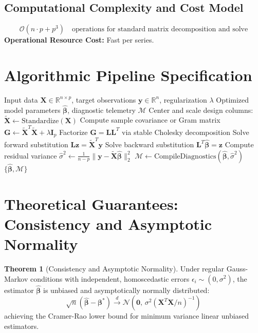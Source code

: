 \documentclass[11pt,a4paper]{article}
\theoremstyle{definition}
\newtheorem{theorem}{\textbf{Theorem}}[section]
\begin{document}
\subsection{Computational Complexity and Cost Model}
\begin{equation}
\mathcal{O}(n \cdot p + p^3) \quad \text{operations for standard matrix decomposition and solve}
\end{equation}
\textbf{Operational Resource Cost:} Fast per series.

\section{Algorithmic Pipeline Specification}

\begin{algorithm}[H]
\caption{Decomposable forecasting models Execution}
\begin{algorithmic}[1]
\Require Input data $\mathbf{X} \in \mathbb{R}^{n \times p}$, target observations $\mathbf{y} \in \mathbb{R}^n$, regularization $\lambda$
\Ensure Optimized model parameters $\hat{\boldsymbol{\beta}}$, diagnostic telemetry $\mathcal{M}$
\State Center and scale design columns: $\tilde{\mathbf{X}} \gets \text{Standardize}(\mathbf{X})$
\State Compute sample covariance or Gram matrix $\mathbf{G} \gets \tilde{\mathbf{X}}^T \tilde{\mathbf{X}} + \lambda \mathbf{I}_p$
\State Factorize $\mathbf{G} = \mathbf{L} \mathbf{L}^T$ via stable Cholesky decomposition
\State Solve forward substitution $\mathbf{L} \mathbf{z} = \tilde{\mathbf{X}}^T \mathbf{y}$
\State Solve backward substitution $\mathbf{L}^T \hat{\boldsymbol{\beta}} = \mathbf{z}$
\State Compute residual variance $\hat{\sigma}^2 \gets \frac{1}{n - p} \| \mathbf{y} - \tilde{\mathbf{X}} \hat{\boldsymbol{\beta}} \|_2^2$
\State $\mathcal{M} \gets \text{CompileDiagnostics}(\hat{\boldsymbol{\beta}}, \hat{\sigma}^2)$
\State \Return $\{\hat{\boldsymbol{\beta}}, \mathcal{M}\}$
\end{algorithmic}
\end{algorithm}

\section{Theoretical Guarantees: Consistency and Asymptotic Normality}

\begin{theorem}[Consistency and Asymptotic Normality]
Under regular Gauss-Markov conditions with independent, homoscedastic errors $\epsilon_i \sim (0, \sigma^2)$, the estimator $\hat{\boldsymbol{\beta}}$ is unbiased and asymptotically normally distributed:
\begin{equation}
\sqrt{n}(\hat{\boldsymbol{\beta}} - \boldsymbol{\beta}^*) \xrightarrow{d} \mathcal{N}\left(\mathbf{0}, \, \sigma^2 (\mathbf{X}^T \mathbf{X} / n)^{-1}\right)
\end{equation}
achieving the Cramer-Rao lower bound for minimum variance linear unbiased estimators.
\end{theorem}
\end{document}
